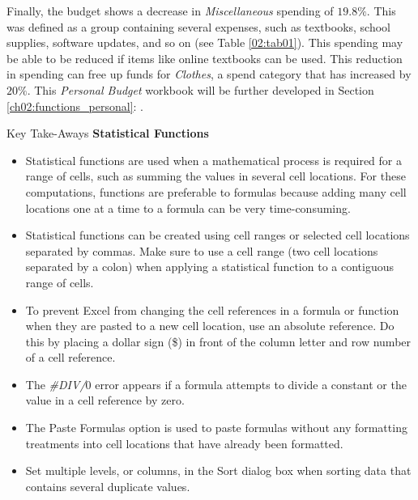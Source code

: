 Finally, the budget shows a decrease in \textit{Miscellaneous} spending of $ 19.8\% $. This was defined as a group containing several expenses, such as textbooks, school supplies, software updates, and so on (see Table \ref{02:tab01}). This spending may be able to be reduced if items like online textbooks can be used. This reduction in spending can free up funds for \textit{Clothes}, a spend category that has increased by $ 20\% $. This \textit{Personal Budget} workbook will be further developed in Section \ref{ch02:functions_personal}: .

\begin{center}
	\begin{tkwbox}{Key Take-Aways}
		\textbf{Statistical Functions}
		\\
		\begin{itemize}
			\setlength{\itemsep}{0pt}
			\setlength{\parskip}{0pt}
			\setlength{\parsep}{0pt}
			
			\item Statistical functions are used when a mathematical process is required for a range of cells, such as summing the values in several cell locations. For these computations, functions are preferable to formulas because adding many cell locations one at a time to a formula can be very time-consuming.
			\item Statistical functions can be created using cell ranges or selected cell locations separated by commas. Make sure to use a cell range (two cell locations separated by a colon) when applying a statistical function to a contiguous range of cells.
			\item To prevent Excel from changing the cell references in a formula or function when they are pasted to a new cell location, use an absolute reference. Do this by placing a dollar sign (\$) in front of the column letter and row number of a cell reference.
			\item The \textit{\#DIV/$ 0 $} error appears if a formula attempts to divide a constant or the value in a cell reference by zero.
			\item The Paste Formulas option is used to paste formulas without any formatting treatments into cell locations that have already been formatted.
			\item Set multiple levels, or columns, in the Sort dialog box when sorting data that contains several duplicate values.
			
		\end{itemize}
	\end{tkwbox}
\end{center}

